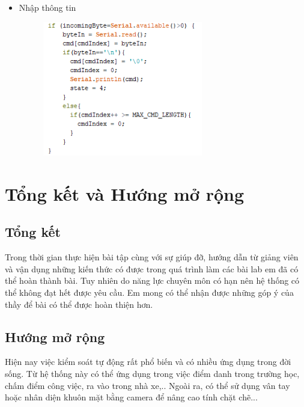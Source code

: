 \documentclass[12pt,titlepage,a4paper]{article}
\begin{document}
\begin{itemize}
\item Nhập thông tin 
\begin{figure}[h!]
\begin{center}
\includegraphics[width=7cm]{10.png}
\end{center}
\end{figure}



\end{itemize}
\newpage
\section{Tổng kết và Hướng mở rộng}
\subsection{Tổng kết}
Trong thời gian thực hiện bài tập cùng với sự giúp đỡ, hướng dẫn từ giảng viên và vận dụng những kiến thức có được trong quá trình làm các bài lab em đã có thể hoàn thành bài. Tuy nhiên do năng lực chuyên môn có hạn nên hệ thống có thể không đạt hết được yêu cầu. Em mong có thể nhận được những góp ý của thầy để bài có thể được hoàn thiện hơn.
\subsection{Hướng mở rộng}
Hiện nay việc kiểm soát tự động rất phổ biến và có nhiều ứng dụng trong đời sống. Từ hệ thống này có thể ứng dụng trong việc điểm danh trong trường học, chấm điểm công việc, ra vào trong nhà xe,.. Ngoài ra, có thể sử dụng vân tay hoặc nhân diện khuôn mặt bằng camera để nâng cao tính chặt chẽ...


\end{document}
